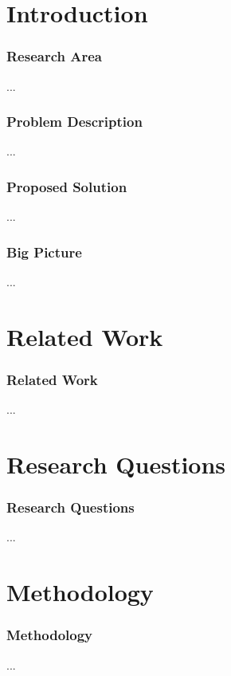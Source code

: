 \section{Introduction}

\begin{frame}
\frametitle{Research Area}

...

\end{frame}

\begin{frame}
\frametitle{Problem Description}

...

\end{frame}

\begin{frame}
\frametitle{Proposed Solution}

...

\end{frame}

\begin{frame}
\frametitle{Big Picture}

...

\end{frame}


\section{Related Work}

\begin{frame}
\frametitle{Related Work}

...

\end{frame}


\section{Research Questions}

\begin{frame}
\frametitle{Research Questions}

...

\end{frame}


\section{Methodology}

\begin{frame}
\frametitle{Methodology}

...

\end{frame}


